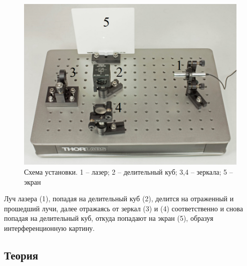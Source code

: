 \documentclass[%
reprint,
russian,
 amsmath,amssymb,
 aps,
]{revtex4-2}
\begin{document}
\begin{figure}[h!]
\includegraphics[width=1\linewidth]{Scheme.png}%
\caption{\label{fig:epsart} Схема установки. 1 -- лазер; 2 -- делительный куб; 3,4 -- зеркала; 5 -- экран}
\end{figure}
Луч лазера (1), попадая на делительный куб (2), делится на отраженный и прошедший лучи, далее отражаясь от зеркал (3) и (4) соответственно и снова попадая на делительный куб, откуда попадают на экран (5), образуя интерференционную картину.

\subsection{\label{sec:level2}Теория}
\end{document}
